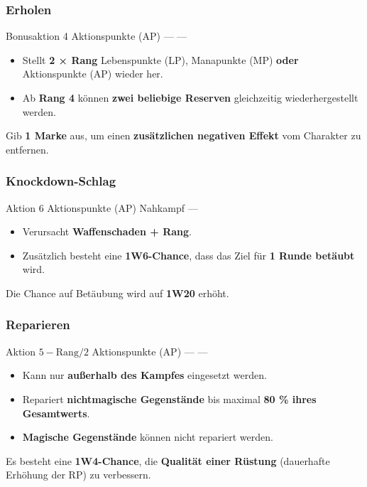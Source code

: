 \subsubsection*{Erholen}

\skillcard
{}
{Bonusaktion}
{4 Aktionspunkte (AP)}
{—}
{—}
{
	\begin{itemize}
		\item Stellt \textbf{2 × Rang} Lebenspunkte (LP), Manapunkte (MP)
		\textbf{oder} Aktionspunkte (AP) wieder her.
		\item Ab \textbf{Rang 4} können \textbf{zwei beliebige Reserven}
		gleichzeitig wiederhergestellt werden.
	\end{itemize}
}
{
	Gib \textbf{1 Marke} aus, um einen \textbf{zusätzlichen negativen Effekt}
	vom Charakter zu entfernen.
}


\subsubsection*{Knockdown-Schlag}

\skillcard
{}
{Aktion}
{6 Aktionspunkte (AP)}
{Nahkampf}
{—}
{
	\begin{itemize}
		\item Verursacht \textbf{Waffenschaden + Rang}.
		\item Zusätzlich besteht eine \textbf{1W6-Chance},
		dass das Ziel für \textbf{1 Runde betäubt} wird.
	\end{itemize}
}
{
	Die Chance auf Betäubung wird auf \textbf{1W20} erhöht.
}


\subsubsection*{Reparieren}

\skillcard
{}
{Aktion}
{$5 - \text{Rang}/2$ Aktionspunkte (AP)}
{—}
{—}
{
	\begin{itemize}
		\item Kann nur \textbf{außerhalb des Kampfes} eingesetzt werden.
		\item Repariert \textbf{nichtmagische Gegenstände}
		bis maximal \textbf{80 \% ihres Gesamtwerts}.
		\item \textbf{Magische Gegenstände} können nicht repariert werden.
	\end{itemize}
}
{
	Es besteht eine \textbf{1W4-Chance}, die \textbf{Qualität einer Rüstung}
	(dauerhafte Erhöhung der RP) zu verbessern.
}


